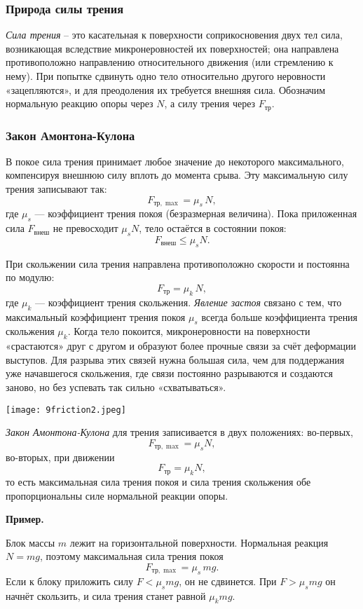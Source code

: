 \documentclass[12pt, a4paper]{article}%
\begin{document}
\subsubsection*{Природа силы трения}

\textit{Сила трения} – это касательная к поверхности соприкосновения двух тел сила, возникающая вследствие микронеровностей их поверхностей; она направлена противоположно направлению относительного движения (или стремлению к нему).
При попытке сдвинуть одно тело относительно другого неровности «зацепляются», и для преодоления их требуется внешняя сила. Обозначим нормальную реакцию опоры через $N$, а силу трения через $F_{\mathrm{тр}}$.

\subsubsection*{Закон Амонтона-Кулона}

В покое сила трения принимает любое значение до некоторого максимального, компенсируя внешнюю силу вплоть до момента срыва. Эту максимальную силу трения записывают так:
\[
F_{\mathrm{тр},\max} = \mu_s\,N,
\]
где $\mu_s$ — коэффициент трения покоя (безразмерная величина). Пока приложенная сила $F_{\mathrm{внеш}}$ не превосходит $\mu_s N$, тело остаётся в состоянии покоя:
\[
F_{\mathrm{внеш}}\le \mu_s N.
\]

При скольжении сила трения направлена противоположно скорости и постоянна по модулю:
\[
F_{\mathrm{тр}} = \mu_k\,N,
\]
где $\mu_k$ — коэффициент трения скольжения. \textit{Явление застоя} связано с тем, что максимальный коэффициент трения покоя $\mu_s$ всегда больше коэффициента трения скольжения $\mu_k$. Когда тело покоится, микронеровности на поверхности «срастаются» друг с другом и образуют более прочные связи за счёт деформации выступов. Для разрыва этих связей нужна большая сила, чем для поддержания уже начавшегося скольжения, где связи постоянно разрываются и создаются заново, но без успевать так сильно «схватываться».


\begin{center}
\texttt{[image: 9friction2.jpeg]}
\label{fig:mpr}
\end{center}

\textit{Закон Амонтона-Кулона} для трения записивается в двух положениях: во-первых,
\[
F_{\mathrm{тр},\max}=\mu_s N,
\]
во-вторых, при движении
\[
F_{\mathrm{тр}}=\mu_k N,
\]
то есть максимальная сила трения покоя и сила трения скольжения обе пропорциональны силе нормальной реакции опоры.

\textbf{Пример.}

Блок массы $m$ лежит на горизонтальной поверхности. Нормальная реакция $N=mg$, поэтому максимальная сила трения покоя
\[
F_{\mathrm{тр},\max}=\mu_s\,mg.
\]
Если к блоку приложить силу $F<\mu_s mg$, он не сдвинется. При $F>\mu_s mg$ он начнёт скользить, и сила трения станет равной $\mu_k mg$.
\end{document}

